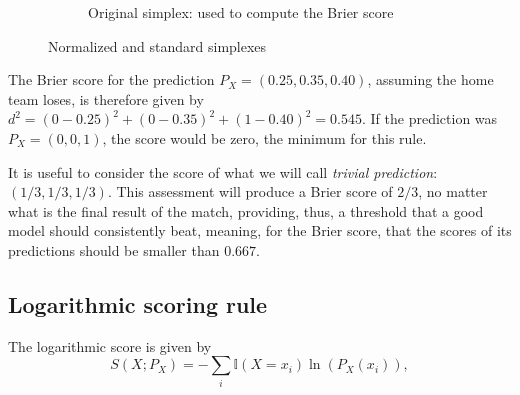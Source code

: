 \documentclass[journal,article,accept,moreauthors,pdftex,12pt,a4paper]{mdpi}
\begin{document}
\begin{figure}[!ht]
\begin{subfigure}[b]{0.48\linewidth}


        \caption{Original simplex: used to compute the Brier score}
        \label{fig:B}
    \end{subfigure}
    \caption{Normalized and standard simplexes}
    \label{fig:norm_stand}
\end{figure}

The Brier score for the prediction $P_X=(0.25,0.35,0.40)$, assuming the home team loses, is therefore given by $d^2=(0-0.25)^2+(0-0.35)^2+(1-0.40)^2=0.545$. 
If the prediction was $P_X=(0,0,1)$, the score would be zero, the minimum for this rule.

It is useful to consider the score of what we will call {\it trivial prediction}: $(1/3,1/3,1/3)$.
This assessment will produce a Brier score of $2/3$, no matter what is the final result of the match, providing, thus, a threshold that a good model should consistently beat, meaning, for the Brier score, that the scores of its predictions should be smaller than $0.667$.  



\subsection{Logarithmic scoring rule}

The logarithmic  score is given by
$$S(X;P_X)=- \sum_{i}\mathbb{I}(X=x_i)\ln(P_X(x_i)),$$
\end{document}
